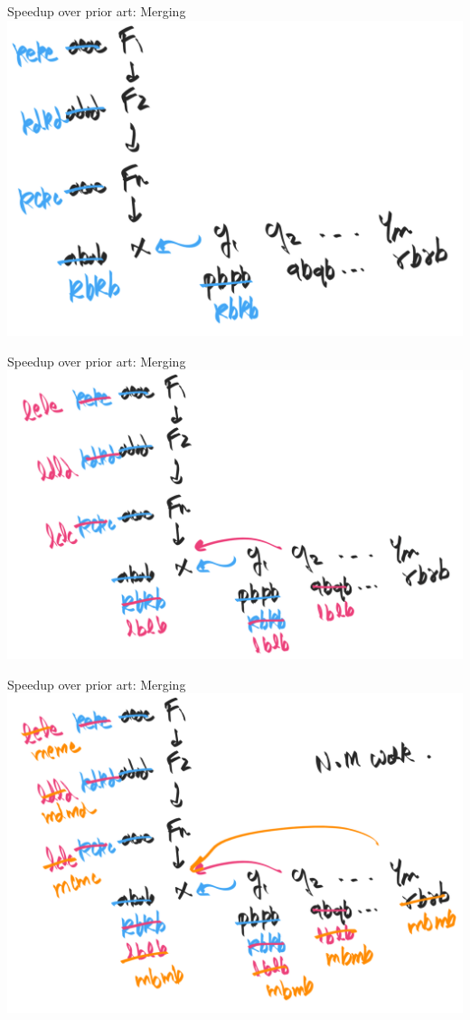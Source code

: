 \documentclass[8pt]{beamer}
\begin{document}
\begin{frame}[fragile]{Speedup over prior art: Merging}
\includegraphics[width=\textwidth]{./eg-2-2.png}
\end{frame}

\begin{frame}[fragile]{Speedup over prior art: Merging}
\includegraphics[width=\textwidth]{./eg-2-3.png}
\end{frame}

\begin{frame}[fragile]{Speedup over prior art: Merging}
\includegraphics[width=\textwidth]{./eg-2-4.png}
\end{frame}
\end{document}
